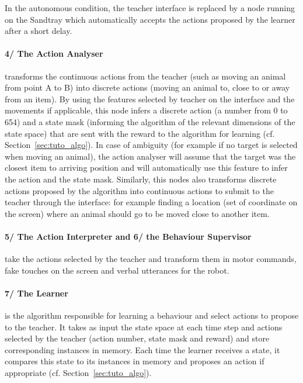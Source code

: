 In the autonomous condition, the teacher interface is replaced by a node running on the Sandtray which automatically accepts the actions proposed by the learner after a short delay.

\paragraph{4/ The Action Analyser} transforms the continuous actions from the teacher (such as moving an animal from point A to B) into discrete actions (moving an animal to, close to or away from an item). By using the features selected by teacher on the interface and the movements if applicable, this node infers a discrete action (a number from 0 to 654) and a state mask (informing the algorithm of the relevant dimensions of the state space) that are sent with the reward to the algorithm for learning (cf. Section~\ref{sec:tuto_algo}). In case of ambiguity (for example if no target is selected when moving an animal), the action analyser will assume that the target was the closest item to arriving position and will automatically use this feature to infer the action and the state mask. Similarly, this nodes also transforms discrete actions proposed by the algorithm into continuous actions to submit to the teacher through the interface: for example finding a location (set of coordinate on the screen) where an animal should go to be moved close to another item.

\paragraph{5/ The Action Interpreter and 6/ the Behaviour Supervisor} take the actions selected by the teacher and transform them in motor commands, fake touches on the screen and verbal utterances for the robot.

\paragraph{7/ The Learner} is the algorithm responsible for learning a behaviour and select actions to propose to the teacher. It takes as input the state space at each time step and actions selected by the teacher (action number, state mask and reward) and store corresponding instances in memory. Each time the learner receives a state, it compares this state to its instances in memory and proposes an action if appropriate (cf. Section~\ref{sec:tuto_algo}).

